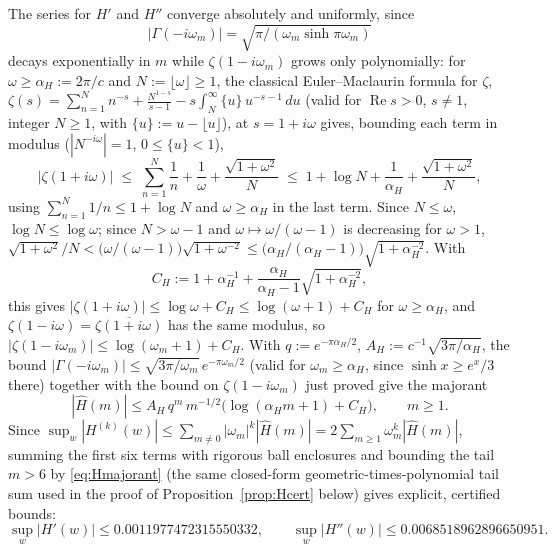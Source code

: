 \documentclass[11pt]{article}
\theoremstyle{definition}
\theoremstyle{remark}
\begin{document}
The series for $H'$ and $H''$ converge absolutely and uniformly, since
\[
|\Gamma(-i\omega_m)| = \sqrt{\pi/(\omega_m \sinh \pi\omega_m)}
\]
decays exponentially in $m$ while $\zeta(1-i\omega_m)$ grows only polynomially: for $\omega\ge
\alpha_H := 2\pi/c$ and $N:=\lfloor\omega\rfloor\ge1$, the classical Euler--Maclaurin formula for
$\zeta$, $\zeta(s) = \sum_{n=1}^N n^{-s} + \frac{N^{1-s}}{s-1} - s\int_N^\infty\{u\}\,u^{-s-1}\,du$
(valid for $\operatorname{Re}s>0$, $s\ne1$, integer $N\ge1$, with $\{u\}:=u-\lfloor u\rfloor$), at
$s=1+i\omega$ gives, bounding each term in modulus ($|N^{-i\omega}|=1$, $0\le\{u\}<1$),
\[
|\zeta(1+i\omega)| \;\le\; \sum_{n=1}^N\frac1n + \frac1\omega + \frac{\sqrt{1+\omega^2}}{N}
\;\le\; 1+\log N + \frac1{\alpha_H} + \frac{\sqrt{1+\omega^2}}N,
\]
using $\sum_{n=1}^N 1/n\le1+\log N$ and $\omega\ge\alpha_H$ in the last term. Since $N\le\omega$,
$\log N\le\log\omega$; since $N>\omega-1$ and $\omega\mapsto\omega/(\omega-1)$ is decreasing for
$\omega>1$, $\sqrt{1+\omega^2}/N < \bigl(\omega/(\omega-1)\bigr)\sqrt{1+\omega^{-2}} \le
\bigl(\alpha_H/(\alpha_H-1)\bigr)\sqrt{1+\alpha_H^{-2}}$. With
\[
C_H := 1+\alpha_H^{-1}+\frac{\alpha_H}{\alpha_H-1}\sqrt{1+\alpha_H^{-2}},
\]
this gives $|\zeta(1+i\omega)|\le\log\omega+C_H\le\log(\omega+1)+C_H$ for $\omega\ge\alpha_H$, and
$\zeta(1-i\omega)=\overline{\zeta(1+i\omega)}$ has the same modulus, so
$|\zeta(1-i\omega_m)|\le\log(\omega_m+1)+C_H$. With $q := e^{-\pi\alpha_H/2}$, $A_H :=
c^{-1}\sqrt{3\pi/\alpha_H}$, the bound $|\Gamma(-i\omega_m)|\le\sqrt{3\pi/\omega_m}\,e^{-\pi\omega_m/2}$
(valid for $\omega_m\ge\alpha_H$, since $\sinh x\ge e^x/3$ there) together with the bound on
$\zeta(1-i\omega_m)$ just proved give the majorant
\begin{equation}
\label{eq:Hmajorant}
|\hat H(m)| \le A_H\,q^m\,m^{-1/2}\bigl(\log(\alpha_H m+1)+C_H\bigr), \qquad m\ge1.
\end{equation}
Since $\sup_w|H^{(k)}(w)| \le \sum_{m\ne0}|\omega_m|^k|\hat H(m)| = 2\sum_{m\ge1}\omega_m^k|\hat
H(m)|$, summing the first six terms with rigorous ball enclosures and bounding the tail $m>6$ by
\eqref{eq:Hmajorant}
(the same closed-form geometric-times-polynomial tail sum used in the proof of
Proposition~\ref{prop:Hcert} below) gives explicit, certified bounds:
\begin{equation}
\label{eq:Hbounds}
\sup_w |H'(w)| \le 0.0011977472315550332, \qquad \sup_w |H''(w)| \le 0.0068518962896650951.
\end{equation}
\end{document}

